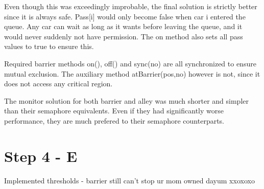 Even though this was exceedingly improbable, the final solution is strictly better since it is always safe. Pass[i] would only become false when car i entered the queue. Any car can wait as long as it wants before leaving the queue, and it would never suddenly not have permission. The on method also sets all pass values to true to ensure this.

Required barrier methods on(), off() and sync(no) are all synchronized to ensure mutual exclusion. The auxiliary method atBarrier(pos,no) however is not, since it does not access any critical region.

The monitor solution for both barrier and alley was much shorter and simpler than their semaphore equivalents. Even if they had significantly worse performance, they are much prefered to their semaphore counterparts.

\section*{Step 4 - E}

Implemented thresholds - barrier still can't stop ur mom owned dayum xxoxoxo

